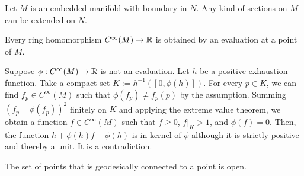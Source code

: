 \documentclass[12pt]{article}
\begin{document}
\begin{prop}
Let $M$ is an embedded manifold with boundary in $N$.
Any kind of sections on $M$ can be extended on $N$.
\end{prop}

\begin{prop}
Every ring homomorphism $C^\infty(M)\to\mathbb{R}$ is obtained by an evaluation at a point of $M$.
\end{prop}
\begin{pf}
Suppose $\phi:C^\infty(M)\to\mathbb{R}$ is not an evaluation.
Let $h$ be a positive exhaustion function.
Take a compact set $K:=h^{-1}([0,\phi(h)])$.
For every $p\in K$, we can find $f_p\in C^\infty(M)$ such that $\phi(f_p)\ne f_p(p)$ by the assumption.
Summing $(f_p-\phi(f_p))^2$ finitely on $K$ and applying the extreme value theorem, we obtain a function $f\in C^\infty(M)$ such that $f\ge0$, $f|_K>1$, and $\phi(f)=0$.
Then, the function $h+\phi(h)f-\phi(h)$ is in kernel of $\phi$ although it is strictly positive and thereby a unit.
It is a contradiction.
\end{pf}


\begin{prop}
The set of points that is geodesically connected to a point is open.
\end{prop}
\end{document}
